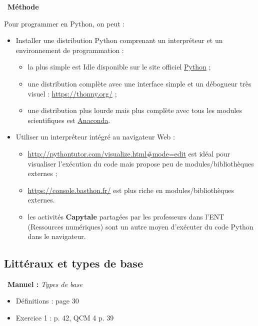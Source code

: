 \documentclass[a4paper, french, 12pt]{article}  %
\newcounter{prop}
\newcounter{prog}
\newenvironment{methode}[1]
{\par \medskip    \noindent  
 \begin {bclogo}[arrondi =0.1,logo=\bcoutil, marge=4,noborder = true] {~\textbf{Méthode}   {\itshape #1} }  \par}
{
\end{bclogo}
 \par \bigskip }
\newenvironment{manuel}[1]
{\par \medskip  \noindent  
\begin{bclogo}[arrondi =0.1,   noborder = true, logo=\bcoeil, marge=4]{~\textbf{Manuel :}  {\itshape #1} }  \itshape \par}
{
\end{bclogo}
 \par \bigskip }
\begin{document}
\begin{methode}{}

Pour programmer en Python, on peut :

\begin{itemize}[label=]

	\item Installer une distribution Python comprenant un interpréteur et un environnement de programmation : 
	\begin{itemize}
		\item la plus simple est Idle disponible sur le site officiel \href{https://docs.python.org/3/tutorial/datastructures.html}{Python} ;
				\item une distribution complète avec une interface simple et un débogueur très visuel : \url{https://thonny.org/} ;
		\item une distribution plus  lourde mais plus complète avec tous les modules scientifiques est \href{https://www.anaconda.com/products/individual}{Anaconda}.
\end{itemize}

\item Utiliser un interpréteur intégré au navigateur Web :

	\begin{itemize}
		\item \url{http://pythontutor.com/visualize.html#mode=edit} est idéal pour visualiser l'exécution du code mais propose peu de modules/bibliothèques externes ;
		\item \url{https://console.basthon.fr/} est plus riche en modules/bibliothèques externes.
			\item les activités \textbf{Capytale} partagées par les professeurs dans l'ENT (Ressources numériques) sont un autre moyen d'exécuter du code Python dans le navigateur.
\end{itemize}
\end{itemize}

\end{methode}


\subsection{Littéraux et types de base}


\begin{manuel}{Types de base}
\begin{itemize}[label=]
 \item Définitions  : page 30
 \item Exercice 1 : p. 42, QCM 4 p. 39
\end{itemize}
\end{manuel}
\end{document}

